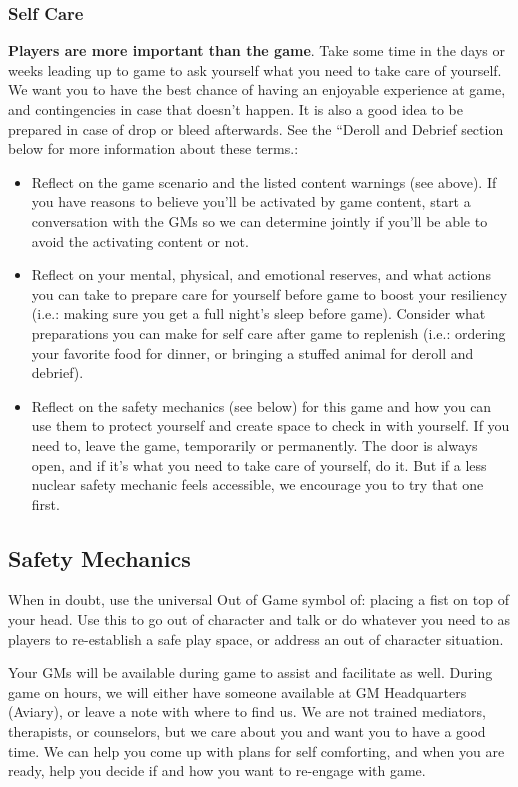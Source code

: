 \documentclass[sheet]{GL2020}
\begin{document}
\subsubsection{Self Care}
\textbf{Players are more important than the game}. Take some time in the days or weeks leading up to game to ask yourself what you need to take care of yourself. We want you to have the best chance of having an enjoyable experience at game, and contingencies in case that doesn’t happen. It is also a good idea to be prepared in case of drop or bleed afterwards. See the ``Deroll and Debrief section below for more information about these terms.:
\begin{itemize}
  \item Reflect on the game scenario and the listed content warnings (see above). If you have reasons to believe you’ll be activated by game content, start a conversation with the GMs so we can determine jointly if you’ll be able to avoid the activating content or not.
  \item Reflect on your mental, physical, and emotional reserves, and what actions you can take to prepare care for yourself before game to boost your resiliency (i.e.: making sure you get a full night's sleep before game). Consider what preparations you can make for self care after game to replenish (i.e.: ordering your favorite food for dinner, or bringing a stuffed animal for deroll and debrief). 
  \item Reflect on the safety mechanics (see below) for this game and how you can use them to protect yourself and create space to check in with yourself. If you need to, leave the game, temporarily or permanently. The door is always open, and if it’s what you need to take care of yourself, do it. But if a less nuclear safety mechanic feels accessible, we encourage you to try that one first.
\end{itemize}

\subsection{Safety Mechanics}
When in doubt, use the universal Out of Game symbol of: placing a fist on top of your head. Use this to go out of character and talk or do whatever you need to as players to re-establish a safe play space, or address an out of character situation. 

Your GMs will be available during game to assist and facilitate as well. During game on hours, we will either have someone available at GM Headquarters (Aviary), or leave a note with where to find us. We are not trained mediators, therapists, or counselors, but we care about you and want you to have a good time. We can help you come up with plans for self comforting, and when you are ready, help you decide if and how you want to re-engage with game.
\end{document}
